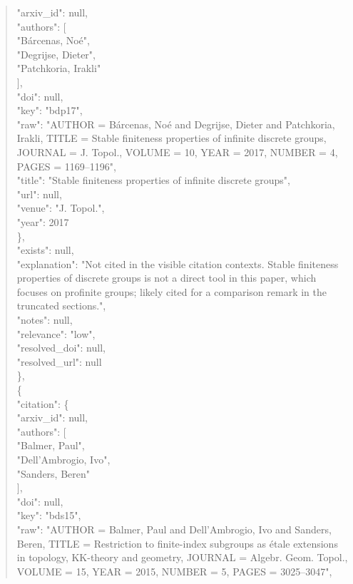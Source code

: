 \documentclass[11pt]{article}
\begin{document}
\begin{quote}
        "arxiv\_id": null,\\
        "authors": [\\
          "Bárcenas, Noé",\\
          "Degrijse, Dieter",\\
          "Patchkoria, Irakli"\\
        ],\\
        "doi": null,\\
        "key": "bdp17",\\
        "raw": "AUTHOR = Bárcenas, Noé and Degrijse, Dieter and Patchkoria, Irakli, TITLE = Stable finiteness properties of infinite discrete groups, JOURNAL = J. Topol., VOLUME = 10, YEAR = 2017, NUMBER = 4, PAGES = 1169--1196",\\
        "title": "Stable finiteness properties of infinite discrete groups",\\
        "url": null,\\
        "venue": "J. Topol.",\\
        "year": 2017\\
      \},\\
      "exists": null,\\
      "explanation": "Not cited in the visible citation contexts. Stable finiteness properties of discrete groups is not a direct tool in this paper, which focuses on profinite groups; likely cited for a comparison remark in the truncated sections.",\\
      "notes": null,\\
      "relevance": "low",\\
      "resolved\_doi": null,\\
      "resolved\_url": null\\
    \},\\
    \{\\
      "citation": \{\\
        "arxiv\_id": null,\\
        "authors": [\\
          "Balmer, Paul",\\
          "Dell'Ambrogio, Ivo",\\
          "Sanders, Beren"\\
        ],\\
        "doi": null,\\
        "key": "bds15",\\
        "raw": "AUTHOR = Balmer, Paul and Dell'Ambrogio, Ivo and Sanders, Beren, TITLE = Restriction to finite-index subgroups as étale extensions in topology, KK-theory and geometry, JOURNAL = Algebr. Geom. Topol., VOLUME = 15, YEAR = 2015, NUMBER = 5, PAGES = 3025--3047",\\

\end{quote}
\end{document}
